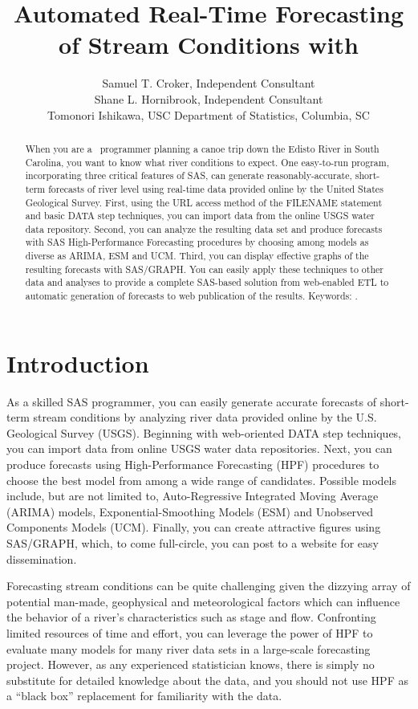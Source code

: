 \documentclass[10pt]{sugconf-ish}
\title{Automated Real-Time Forecasting of Stream Conditions with \SASregistered}
\author{Samuel T. Croker,  Independent Consultant\\
Shane L. Hornibrook,  Independent Consultant \\
Tomonori Ishikawa, USC Department of Statistics, Columbia, SC}
\begin{document}
\begin{abstract}
When you are a \SASregistered\ programmer planning a canoe trip down the Edisto River in South Carolina, you want to know what river conditions to expect. One easy-to-run program, incorporating three critical features of SAS, can generate reasonably-accurate, short-term forecasts of river level using real-time data provided online by the United States Geological Survey. First, using the URL access method of the FILENAME statement and basic DATA step techniques, you can import data from the online USGS water data repository. Second, you can analyze the resulting data set and produce forecasts with SAS High-Performance Forecasting procedures by choosing among models as diverse as ARIMA, ESM and UCM. Third, you can display effective graphs of the resulting forecasts with SAS/GRAPH. You can easily apply these techniques to other data and analyses to provide a complete SAS-based solution from web-enabled ETL to automatic generation of forecasts to web publication of the results. Keywords: \SUGconfKeywords.
\end{abstract}


\section{Introduction}

As a skilled SAS programmer, you can easily generate accurate forecasts of short-term stream conditions by analyzing river data provided online by the U.S. Geological Survey (USGS). Beginning with web-oriented DATA step techniques, you can import data from online USGS water data repositories. Next, you can produce forecasts using High-Performance Forecasting (HPF) procedures to choose the best model from among a wide range of candidates. Possible models include, but are not limited to, Auto-Regressive Integrated Moving Average (ARIMA) models, Exponential-Smoothing Models (ESM) and Unobserved Components Models (UCM). Finally, you can create attractive figures using SAS/GRAPH, which, to come full-circle, you can post to a website for easy dissemination.

Forecasting stream conditions can be quite challenging given the dizzying array of potential man-made, geophysical and meteorological factors which can influence the behavior of a river's characteristics such as stage and flow. Confronting limited resources of time and effort, you can leverage the power of HPF to evaluate many models for many river data sets in a large-scale forecasting project. However, as any experienced statistician knows, there is simply no substitute for detailed knowledge about the data, and you should not use HPF as a ``black box'' replacement for familiarity with the data.
\end{document}
